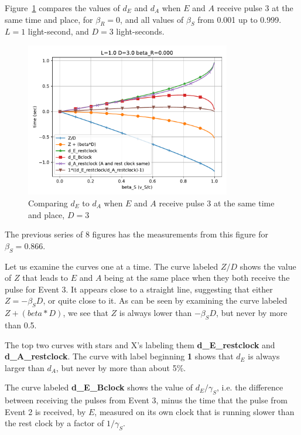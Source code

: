 \documentclass[a4paper]{article}
\theoremstyle{plain}
\theoremstyle{definition}
\begin{document}
Figure~\ref{fig:compare-d_E-to-d_A-D-3} compares the values of $d_E$ and
$d_A$ when $E$ and $A$ receive pulse 3 at the same time and place, for
$\beta_R = 0$, and all values of $\beta_S$ from 0.001 up to 0.999.
$L=1$ light-second, and $D=3$ light-seconds.
\begin{figure}[h!]
	\centering
	\includegraphics[width=0.8\textwidth]{scen2b-where-E-starts-to-receive-pulse-3-at-A-location-D-3.0-beta_R-0.000.pdf}
	\caption{Comparing $d_E$ to $d_A$ when $E$ and $A$ receive pulse 3 at the same time and place, $D=3$}
	\label{fig:compare-d_E-to-d_A-D-3}
\end{figure}
The previous series of 8 figures has the measurements from this figure
for $\beta_S=0.866$.

Let us examine the curves one at a time.  The curve labeled $Z/D$
shows the value of $Z$ that leads to $E$ and $A$ being at the same
place when they both receive the pulse for Event 3.  It appears close
to a straight line, suggesting that either $Z = -\beta_S D$, or quite
close to it.  As can be seen by examining the curve labeled
$Z+(beta*D)$, we see that $Z$ is always lower than $-\beta_SD$, but
never by more than 0.5.

The top two curves with stars and X's labeling them
\textbf{d\_E\_restclock} and \textbf{d\_A\_restclock}.  The curve with
label beginning \textbf{1} shows that $d_E$ is always larger than
$d_A$, but never by more than about 5\%.

The curve labeled \textbf{d\_E\_Bclock} shows the value of
$d_E / \gamma_S$, i.e. the difference between receiving the pulses
from Event 3, minus the time that the pulse from Event 2 is received,
by $E$, measured on its own clock that is running slower than the rest
clock by a factor of $1/\gamma_S$.
\end{document}
